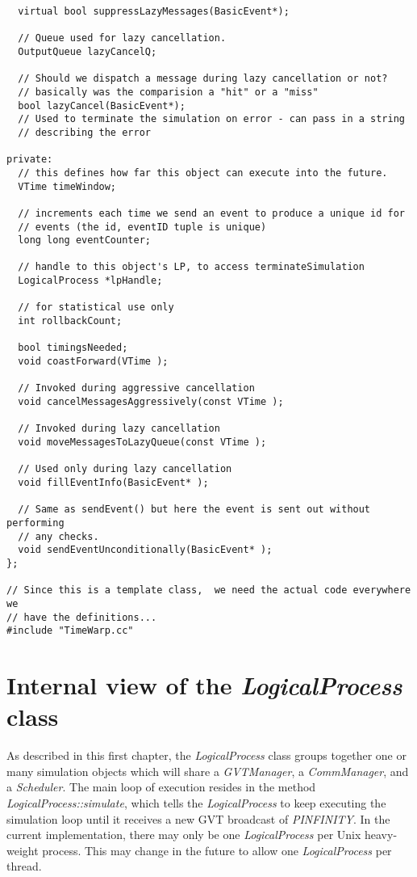 \documentclass[11pt]{report}
\begin{document}
\begin{verbatim}
  virtual bool suppressLazyMessages(BasicEvent*);

  // Queue used for lazy cancellation.
  OutputQueue lazyCancelQ;

  // Should we dispatch a message during lazy cancellation or not? 
  // basically was the comparision a "hit" or a "miss"
  bool lazyCancel(BasicEvent*);
  // Used to terminate the simulation on error - can pass in a string
  // describing the error

private:
  // this defines how far this object can execute into the future.
  VTime timeWindow;

  // increments each time we send an event to produce a unique id for 
  // events (the id, eventID tuple is unique)
  long long eventCounter;

  // handle to this object's LP, to access terminateSimulation
  LogicalProcess *lpHandle;

  // for statistical use only
  int rollbackCount;

  bool timingsNeeded;
  void coastForward(VTime );

  // Invoked during aggressive cancellation
  void cancelMessagesAggressively(const VTime );

  // Invoked during lazy cancellation
  void moveMessagesToLazyQueue(const VTime );

  // Used only during lazy cancellation
  void fillEventInfo(BasicEvent* );

  // Same as sendEvent() but here the event is sent out without performing
  // any checks.
  void sendEventUnconditionally(BasicEvent* );
};

// Since this is a template class,  we need the actual code everywhere we
// have the definitions...
#include "TimeWarp.cc"
\end{verbatim}

\section{Internal view of the {\it LogicalProcess} class}

As described in this first chapter, the {\it LogicalProcess} class groups
together one or many simulation objects which will share a {\it
GVTManager}, a {\it CommManager}, and a {\it Scheduler}.  The main loop of
execution resides in the method {\it LogicalProcess::simulate}, which
tells the {\it LogicalProcess} to keep executing the simulation loop until
it receives a new GVT broadcast of {\it PINFINITY}.  In the current
implementation, there may only be one {\it LogicalProcess} per Unix
heavy-weight process.  This may change in the future to allow one {\it
LogicalProcess} per thread.
\end{document}
